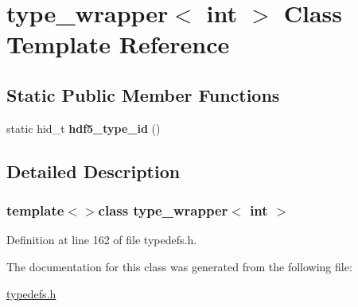 \hypertarget{classtype__wrapper_3_01int_01_4}{}\section{type\+\_\+wrapper$<$ int $>$ Class Template Reference}
\label{classtype__wrapper_3_01int_01_4}
\subsection*{Static Public Member Functions}
\begin{DoxyCompactItemize}
\item 
\hypertarget{classtype__wrapper_3_01int_01_4_acdb96303d9eb8bde578da49d4732da3c}{}static hid\+\_\+t {\bfseries hdf5\+\_\+type\+\_\+id} ()\label{classtype__wrapper_3_01int_01_4_acdb96303d9eb8bde578da49d4732da3c}

\end{DoxyCompactItemize}


\subsection{Detailed Description}
\subsubsection*{template$<$$>$class type\+\_\+wrapper$<$ int $>$}



Definition at line 162 of file typedefs.\+h.



The documentation for this class was generated from the following file\+:\begin{DoxyCompactItemize}
\item 
\hyperlink{typedefs_8h}{typedefs.\+h}\end{DoxyCompactItemize}
